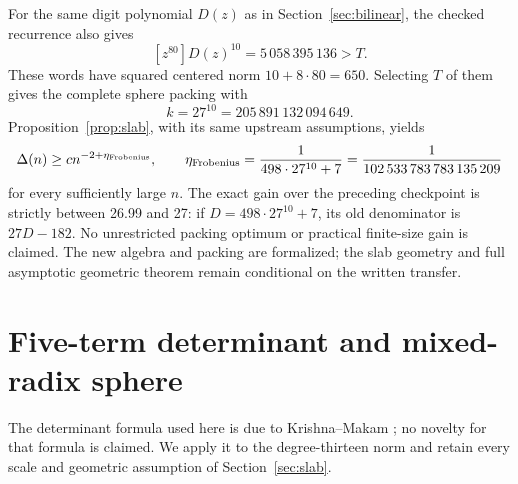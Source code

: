 \documentclass[11pt]{article}
\begin{document}
For the same digit polynomial \(D(z)\) as in Section~\ref{sec:bilinear},
the checked recurrence also gives
\[
 [z^{80}]D(z)^{10}=5\,058\,395\,136>T.
\]
These words have squared centered norm \(10+8\cdot80=650\).
Selecting \(T\) of them gives the complete sphere packing with
\[
 k=27^{10}=205\,891\,132\,094\,649.
\]
Proposition~\ref{prop:slab}, with its same upstream assumptions, yields
\[
 \Delta(n)\ge c n^{-2+\eta_{\rm Frobenius}},\qquad
 \eta_{\rm Frobenius}=\frac1{498\cdot27^{10}+7}
   =\frac1{102\,533\,783\,783\,135\,209}
\]
for every sufficiently large \(n\). The exact gain over the preceding
checkpoint is strictly between 26.99 and 27: if
\(D=498\cdot27^{10}+7\), its old denominator is \(27D-182\).
No unrestricted packing optimum or practical finite-size gain is claimed.
The new algebra and packing are formalized; the slab geometry and full
asymptotic geometric theorem remain conditional on the written transfer.

\section{Five-term determinant and mixed-radix sphere}\label{sec:rankfive}
The determinant formula used here is due to Krishna--Makam
\cite{krishna-makam}; no novelty for that formula is claimed.
We apply it to the degree-thirteen norm and retain every scale and
geometric assumption of Section~\ref{sec:slab}.
\end{document}
